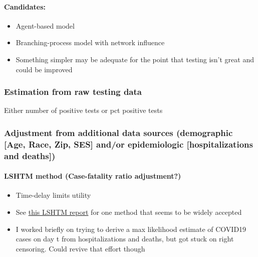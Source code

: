 \documentclass[]{article}
\providecommand{\tightlist}{%
  \setlength{\itemsep}{0pt}\setlength{\parskip}{0pt}}
\let\oldparagraph\paragraph
\renewcommand{\paragraph}[1]{\oldparagraph{#1}\mbox{}}
\begin{document}
\hypertarget{candidates}{%
\paragraph{Candidates:}\label{candidates}}

\begin{itemize}
\tightlist
\item
  Agent-based model\\
\item
  Branching-process model with network influence\\
\item
  Something simpler may be adequate for the point that testing isn't
  great and could be improved
\end{itemize}

\hypertarget{estimation-from-raw-testing-data}{%
\subsubsection{Estimation from raw testing
data}\label{estimation-from-raw-testing-data}}

Either number of positive tests or pct positive tests

\hypertarget{adjustment-from-additional-data-sources-demographic-age-race-zip-ses-andor-epidemiologic-hospitalizations-and-deaths}{%
\subsubsection{Adjustment from additional data sources (demographic
{[}Age, Race, Zip, SES{]} and/or epidemiologic {[}hospitalizations and
deaths{]})}\label{adjustment-from-additional-data-sources-demographic-age-race-zip-ses-andor-epidemiologic-hospitalizations-and-deaths}}

\hypertarget{lshtm-method-case-fatality-ratio-adjustment}{%
\paragraph{LSHTM method (Case-fatality ratio
adjustment?)}\label{lshtm-method-case-fatality-ratio-adjustment}}

\begin{itemize}
\tightlist
\item
  Time-delay limits utility\\
\item
  See
  \href{https://cmmid.github.io/topics/covid19/global_cfr_estimates.html}{this
  LSHTM report} for one method that seems to be widely accepted\\
\item
  I worked briefly on trying to derive a max likelihood estimate of
  COVID19 cases on day t from hospitalizations and deaths, but got stuck
  on right censoring. Could revive that effort though
\end{itemize}
\end{document}

